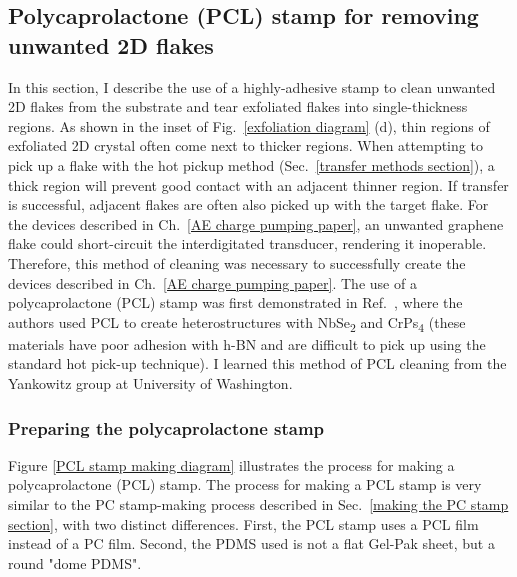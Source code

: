 \documentclass[double,12pt,1in,seploa]{beavtex}
\let\Oldsubsection\subsection
\renewcommand{\subsection}{\FloatBarrier\Oldsubsection}
\let\Oldsubsubsection\subsubsection
\renewcommand{\subsubsection}{\FloatBarrier\Oldsubsubsection}
\begin{document}
\subsection{Polycaprolactone (PCL) stamp for removing unwanted 2D flakes}
In this section, I describe the use of a highly-adhesive stamp to clean unwanted 2D flakes from the substrate and tear exfoliated flakes into single-thickness regions. As shown in the inset of Fig.\ \ref{exfoliation diagram} (d), thin regions of exfoliated 2D crystal often come next to thicker regions. When attempting to pick up a flake with the hot pickup method (Sec.\ \ref{transfer methods section}), a thick region will prevent good contact with an adjacent thinner region. If transfer is successful, adjacent flakes are often also picked up with the target flake. For the devices described in Ch.\ \ref{AE charge pumping paper}, an unwanted graphene flake could short-circuit the interdigitated transducer, rendering it inoperable. Therefore, this method of cleaning was necessary to successfully create the devices described in Ch.\ \ref{AE charge pumping paper}. The use of a polycaprolactone (PCL) stamp was first demonstrated in Ref.\ \cite{son_strongly_2020}, where the authors used PCL to create heterostructures with NbSe\textsubscript{2} and CrPs\textsubscript{4} (these materials have poor adhesion with h-BN and are difficult to pick up using the standard hot pick-up technique). I learned this method of PCL cleaning from the Yankowitz group at University of Washington. 

\subsubsection{Preparing the polycaprolactone stamp}


Figure \ref{PCL stamp making diagram} illustrates the process for making a polycaprolactone (PCL) stamp. The process for making a PCL stamp is very similar to the PC stamp-making process described in Sec.\ \ref{making the PC stamp section}, with two distinct differences. First, the PCL stamp uses a PCL film instead of a PC film. Second, the PDMS used is not a flat Gel-Pak sheet, but a round "dome PDMS". 
\end{document}
